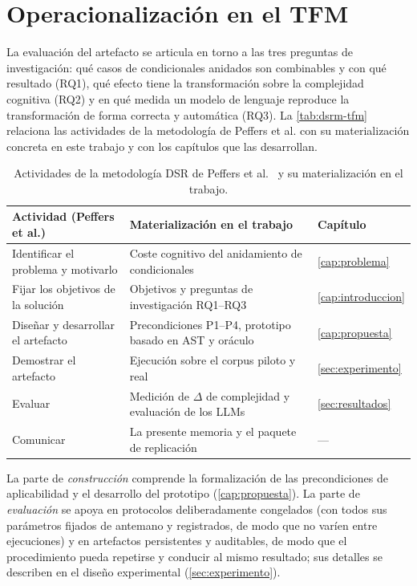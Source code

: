 \section{Operacionalización en el TFM}
\label{sec:dsr-operacion}
\label{sec:operacionalizacion}

La evaluación del artefacto se articula en torno a las tres preguntas de
investigación: qué casos de condicionales anidados son combinables y con qué
resultado (RQ1), qué efecto tiene la transformación sobre la complejidad
cognitiva (RQ2) y en qué medida un modelo de lenguaje reproduce la
transformación de forma correcta y automática (RQ3). La
\autoref{tab:dsrm-tfm} relaciona las actividades de la metodología de Peffers
et al. con su materialización concreta en este trabajo y con los capítulos que
las desarrollan.

\begin{table}[ht]
\centering
\caption{Actividades de la metodología DSR de Peffers et
al.~\cite{10.2753/MIS0742-1222240302} y su materialización en el trabajo.}
\label{tab:dsrm-tfm}
\begin{tabular}{@{}p{4.2cm}p{5.2cm}p{2.6cm}@{}}
\toprule
\textbf{Actividad (Peffers et al.)} & \textbf{Materialización en el trabajo} & \textbf{Capítulo} \\
\midrule
Identificar el problema y motivarlo & Coste cognitivo del anidamiento de condicionales & \ref{cap:problema} \\
Fijar los objetivos de la solución  & Objetivos y preguntas de investigación RQ1--RQ3 & \ref{cap:introduccion} \\
Diseñar y desarrollar el artefacto  & Precondiciones P1--P4, prototipo basado en AST y oráculo & \ref{cap:propuesta} \\
Demostrar el artefacto              & Ejecución sobre el corpus piloto y real & \ref{sec:experimento} \\
Evaluar                             & Medición de $\Delta$ de complejidad y evaluación de los LLMs & \ref{sec:resultados} \\
Comunicar                           & La presente memoria y el paquete de replicación & --- \\
\bottomrule
\end{tabular}
\end{table}

La parte de \emph{construcción} comprende la formalización de las
precondiciones de aplicabilidad y el desarrollo del prototipo
(\autoref{cap:propuesta}). La parte de \emph{evaluación} se apoya en
protocolos deliberadamente congelados (con todos sus parámetros fijados de
antemano y registrados, de modo que no varíen entre ejecuciones) y en
artefactos persistentes y auditables, de modo que el procedimiento pueda
repetirse y conducir al mismo resultado; sus detalles se describen en el diseño experimental
(\autoref{sec:experimento}).

